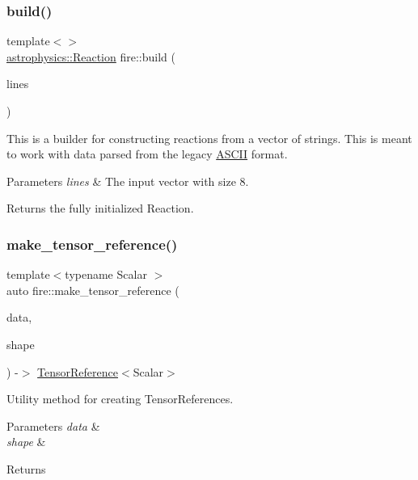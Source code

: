 \subsubsection{\texorpdfstring{build()}{build()}\hspace{0.1cm}{\footnotesize\ttfamily [6/6]}}
{\footnotesize\ttfamily template$<$$>$ \\
\hyperlink{a01716}{astrophysics\+::\+Reaction} fire\+::build (\begin{DoxyParamCaption}\item[{const vector$<$ string $>$ \&}]{lines }\end{DoxyParamCaption})}

This is a builder for constructing reactions from a vector of strings. This is meant to work with data parsed from the legacy \hyperlink{a02172}{A\+S\+C\+II} format. 
\begin{DoxyParams}{Parameters}
{\em lines} & The input vector with size 8. \\
\hline
\end{DoxyParams}
\begin{DoxyReturn}{Returns}
the fully initialized Reaction. 
\end{DoxyReturn}
\mbox{\label{a00648_aaab26473f8b0cb78cff67ae06ff7ce80}} 
\subsubsection{\texorpdfstring{make\+\_\+tensor\+\_\+reference()}{make\_tensor\_reference()}}
{\footnotesize\ttfamily template$<$typename Scalar $>$ \\
auto fire\+::make\+\_\+tensor\+\_\+reference (\begin{DoxyParamCaption}\item[{Scalar $\ast$}]{data,  }\item[{\hyperlink{a01824}{Tensor\+Shape} \&}]{shape }\end{DoxyParamCaption}) -\/$>$ \hyperlink{a00648_a1bf491fd1c876e2808648b2fd291e3dd}{Tensor\+Reference}$<$Scalar$>$ }

Utility method for creating Tensor\+References.


\begin{DoxyParams}{Parameters}
{\em data} & \\
\hline
{\em shape} & \\
\hline
\end{DoxyParams}
\begin{DoxyReturn}{Returns}

\end{DoxyReturn}
\mbox{\label{a00648_a2b47cfd8a5d8711cdc55e1397487b90b}} 

